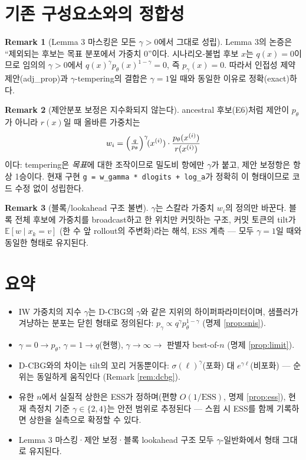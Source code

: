 \documentclass[11pt]{article}
\newcommand{\code}[1]{\texttt{\small #1}}
\newcommand{\pth}{p_\theta}
\newcommand{\qexc}{q}
\newcommand{\ESS}{\mathrm{ESS}}
\theoremstyle{plain}
\theoremstyle{definition}
\newtheorem{remark}{Remark}
\begin{document}
\section{기존 구성요소와의 정합성}

\begin{remark}[Lemma 3 마스킹은 모든 $\gamma > 0$에서 그대로 성립]
Lemma 3의 논증은 ``제외되는 후보는 목표 분포에서 가중치 0''이다. 시나리오-불법 후보
$x$는 $\qexc(x) = 0$이므로 임의의 $\gamma > 0$에서
$\qexc(x)^{\gamma}\pth(x)^{1-\gamma} = 0$, 즉 $p_\gamma(x) = 0$. 따라서 인접성 제약
제안(adj\_prop)과 $\gamma$-tempering의 결합은 $\gamma = 1$일 때와 동일한 이유로
정확(exact)하다.
\end{remark}

\begin{remark}[제안분포 보정은 지수화되지 않는다]
ancestral 후보(E6)처럼 제안이 $\pth$가 아니라 $r(x)$일 때 올바른 가중치는
\[
w_i = \Bigl(\tfrac{\qexc}{\pth}\Bigr)^{\gamma}\!(x^{(i)})
\cdot \frac{\pth(x^{(i)})}{r(x^{(i)})}
\]
이다: tempering은 \emph{목표}에 대한 조작이므로 밀도비 항에만 $\gamma$가 붙고, 제안
보정항은 항상 1승이다. 현재 구현 \code{g = w\_gamma * dlogits + log\_a}가 정확히 이
형태이므로 코드 수정 없이 성립한다.
\end{remark}

\begin{remark}[블록/lookahead 구조 불변]
$\gamma$는 스칼라 가중치 $w_i$의 정의만 바꾼다. 블록 전체 후보에 가중치를 broadcast하고
한 위치만 커밋하는 구조, 커밋 토큰의 tilt가 $\mathbb{E}[w \mid x_k = v]$ (한 수 앞
rollout의 주변화)라는 해석, ESS 계측 --- 모두 $\gamma = 1$일 때와 동일한 형태로
유지된다.
\end{remark}

\section{요약}

\begin{itemize}[leftmargin=1.4em]
\item IW 가중치의 지수 $\gamma$는 D-CBG의 $\gamma$와 같은 지위의 하이퍼파라미터이며,
샘플러가 겨냥하는 분포는 닫힌 형태로 정의된다:
$p_\gamma \propto \qexc^{\gamma} \pth^{1-\gamma}$ (명제 \ref{prop:snis}).
\item $\gamma = 0 \to \pth$, $\gamma = 1 \to \qexc$(현행), $\gamma \to \infty \to$
판별자 best-of-$n$ (명제 \ref{prop:limit}).
\item D-CBG와의 차이는 tilt의 꼬리 거동뿐이다: $\sigma(\ell)^\gamma$(포화) 대
$e^{\gamma\ell}$(비포화) --- 순위는 동일하게 움직인다 (Remark \ref{rem:dcbg}).
\item 유한 $n$에서 실질적 상한은 ESS가 정하며(편향 $O(1/\ESS)$, 명제 \ref{prop:ess}),
현재 측정치 기준 $\gamma \in \{2, 4\}$는 안전 범위로 추정된다 --- 스윕 시 ESS를 함께
기록하면 상한을 실측으로 확정할 수 있다.
\item Lemma 3 마스킹·제안 보정·블록 lookahead 구조 모두 $\gamma$-일반화에서 형태
그대로 유지된다.
\end{itemize}
\end{document}
